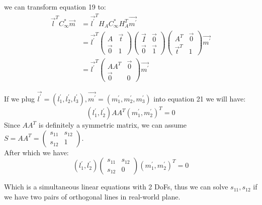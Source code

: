 \documentclass[conference]{IEEEtran}
\let\oldvec\vec
\renewcommand{\vec}[1]{\oldvec{\mathit{#1}}}
\begin{document}
\noindent we can transform equation 19 to:
\begin{equation}
	\begin{split}
		\vec{l}^T C^*_{\infty} \vec{m} &= \vec{l^\prime}^TH_{A}C_{\infty}^*H_A^T\vec{m^\prime}\\
		&= \vec{l^\prime}^T
		\begin{pmatrix}
			A & \vec{t}\\
			\vec{0} & 1
		\end{pmatrix}
		\begin{pmatrix}
			\vec{I} & \vec{0}\\
			\vec{0} & \vec{1}
		\end{pmatrix}
		\begin{pmatrix}
			A^T & \vec{0}\\
			\vec{t}^T & 1
		\end{pmatrix}
		\vec{m^\prime}\\
		& = \vec{l^\prime}^T
		\begin{pmatrix}
			AA^T & \vec{0}\\
			\vec{0} & 0
		\end{pmatrix}
		\vec{m^\prime}
	\end{split}
\end{equation}


\noindent If we plug $\vec{l^\prime} = (l_1^\prime, l_2^\prime, l_3^\prime), \vec{m^\prime} = (m_1^\prime, m_2^\prime, m_3^\prime)$ into equation 21 we will have:
\begin{equation}
	(l_1^\prime, l_2^\prime)AA^T(m_1^\prime, m_2^\prime)^T = 0
\end{equation}
\noindent Since $AA^T$ is definitely a symmetric matrix, we can assume $S=AA^T=\begin{pmatrix}
s_{11} & s_{12}\\
s_{12} & 1
\end{pmatrix}$.\\

\noindent After which we have:
\begin{equation}
	(l_1^\prime, l_2^\prime)
	\begin{pmatrix}
		s_{11} & s_{12}\\
		s_{12} & 0
	\end{pmatrix}
	(m_1^\prime, m_2^\prime)^T = 0
\end{equation}

\noindent Which is a simultaneous linear equations with 2 DoFs, thus we can solve $s_{11}, s_{12}$ if we have two pairs of orthogonal lines in real-world plane.
\end{document}
